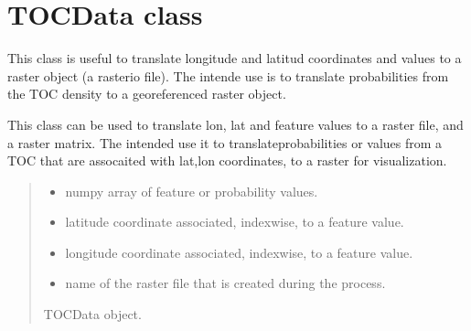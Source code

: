 \documentclass[letterpaper,10pt,english]{sphinxmanual}
\begin{document}
\section{TOCData class}
\label{\detokenize{usage:tocdata-class}}
\sphinxAtStartPar
This class is useful to translate longitude and latitud coordinates and values to a raster object (a rasterio file).
The intende use is to translate probabilities from the TOC density to a georeferenced raster object.

\begin{fulllineitems}
\label{\detokenize{usage:tocdata.TOCData}}
\pysigstartsignatures
{}
\pysigstopsignatures
\sphinxAtStartPar
This class can be used to translate lon, lat and feature values to a raster file, and a raster matrix.
The intended use it to translateprobabilities or values from a TOC that are assocaited with lat,lon coordinates,
to a raster for visualization.
\begin{quote}\begin{description}
\begin{itemize}
\item {} 
\sphinxAtStartPar
{} \textendash{} numpy array of feature or probability values.

\item {} 
\sphinxAtStartPar
{} \textendash{} latitude coordinate associated, index\sphinxhyphen{}wise, to a feature value.

\item {} 
\sphinxAtStartPar
{} \textendash{} longitude coordinate associated, index\sphinxhyphen{}wise,  to a feature value.

\item {} 
\sphinxAtStartPar
{} \textendash{} name of the raster file that is created during the process.

\end{itemize}

\sphinxAtStartPar
TOCData object.

\sphinxAtStartPar
{\hyperref[\detokenize{usage:tocdata.TOCData}]{}}

\end{description}\end{quote}

\end{fulllineitems}
\end{document}
